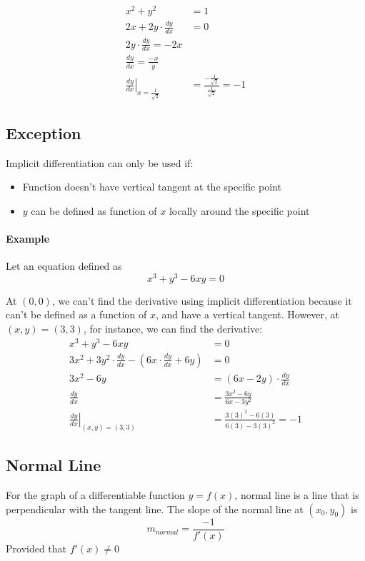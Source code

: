 \documentclass[12pt]{article}
\begin{document}
\begin{align*} 
    x^2 + y^2 &= 1 \\
    2x + 2y \cdot \frac{dy}{dx} &= 0 \\
    2y \cdot \frac{dy}{dx} = - 2x \\
    \frac{dy}{dx} = \frac{ -x}{y} \\
    \left. \frac{dy}{dx} \right|_{x = \frac{1}{\sqrt{2}}} &= \frac{ - \frac{1}{\sqrt{2}}}{\frac{1}{\sqrt{2}}} = - 1 
\end{align*} 

\subsection{Exception}
Implicit differentiation can only be used if:
\begin{itemize} 
     \item Function doesn't have vertical tangent at the specific point
     \item $y$ can be defined as function of $x$ locally around the specific point 
\end{itemize}

\paragraph{Example} Let an equation defined as
\[
    x^3 + y^3 - 6xy = 0
\]

At $(0,0)$, we can't find the derivative using implicit differentiation because it can't be defined as a function of $x$, and
have a vertical tangent. However, at $(x,y) = (3,3)$, for instance, we can find the derivative:
\begin{align*} 
     x^3 + y^3 - 6xy &= 0 \\
     3x^2 + 3y^2 \cdot \frac{dy}{dx} - (6x \cdot \frac{dy}{dx} + 6y) &= 0 \\
     3x^2 - 6y &= (6x - 2y) \cdot \frac{dy}{dx} \\
     \frac{dy}{dx} &= \frac{3x^2 - 6y}{6x - 3y^2} \\
     \left. \frac{dy}{dx} \right|_{(x,y) = (3,3)} &= \frac{3(3)^2 - 6(3)}{6(3) - 3(3)^2} = - 1
\end{align*}

\subsection{Normal Line}
For the graph of a differentiable function $y = f(x)$, normal line is a line that is perpendicular
with the tangent line. The slope of the normal line at $(x_0, y_0)$ is 
\[
    m_{normal} = \frac{ -1}{f'(x)}
\] 
Provided that $f'(x) \neq 0$
\end{document}
